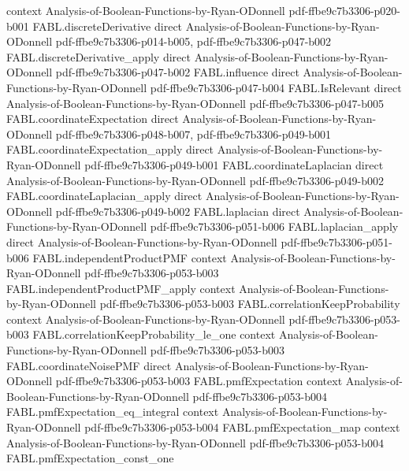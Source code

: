 \begin{theorem}
  {context}
  {Analysis-of-Boolean-Functions-by-Ryan-ODonnell}
  {pdf-ffbe9c7b3306-p020-b001}
\proofstep
  {FABL.discreteDerivative}
  {direct}
  {Analysis-of-Boolean-Functions-by-Ryan-ODonnell}
  {pdf-ffbe9c7b3306-p014-b005,
    pdf-ffbe9c7b3306-p047-b002}
\proofstep
  {FABL.discreteDerivative_apply}
  {direct}
  {Analysis-of-Boolean-Functions-by-Ryan-ODonnell}
  {pdf-ffbe9c7b3306-p047-b002}
\proofstep
  {FABL.influence}
  {direct}
  {Analysis-of-Boolean-Functions-by-Ryan-ODonnell}
  {pdf-ffbe9c7b3306-p047-b004}
\proofstep
  {FABL.IsRelevant}
  {direct}
  {Analysis-of-Boolean-Functions-by-Ryan-ODonnell}
  {pdf-ffbe9c7b3306-p047-b005}
\proofstep
  {FABL.coordinateExpectation}
  {direct}
  {Analysis-of-Boolean-Functions-by-Ryan-ODonnell}
  {pdf-ffbe9c7b3306-p048-b007,
    pdf-ffbe9c7b3306-p049-b001}
\proofstep
  {FABL.coordinateExpectation_apply}
  {direct}
  {Analysis-of-Boolean-Functions-by-Ryan-ODonnell}
  {pdf-ffbe9c7b3306-p049-b001}
\proofstep
  {FABL.coordinateLaplacian}
  {direct}
  {Analysis-of-Boolean-Functions-by-Ryan-ODonnell}
  {pdf-ffbe9c7b3306-p049-b002}
\proofstep
  {FABL.coordinateLaplacian_apply}
  {direct}
  {Analysis-of-Boolean-Functions-by-Ryan-ODonnell}
  {pdf-ffbe9c7b3306-p049-b002}
\proofstep
  {FABL.laplacian}
  {direct}
  {Analysis-of-Boolean-Functions-by-Ryan-ODonnell}
  {pdf-ffbe9c7b3306-p051-b006}
\proofstep
  {FABL.laplacian_apply}
  {direct}
  {Analysis-of-Boolean-Functions-by-Ryan-ODonnell}
  {pdf-ffbe9c7b3306-p051-b006}
\proofstep
  {FABL.independentProductPMF}
  {context}
  {Analysis-of-Boolean-Functions-by-Ryan-ODonnell}
  {pdf-ffbe9c7b3306-p053-b003}
\proofstep
  {FABL.independentProductPMF_apply}
  {context}
  {Analysis-of-Boolean-Functions-by-Ryan-ODonnell}
  {pdf-ffbe9c7b3306-p053-b003}
\proofstep
  {FABL.correlationKeepProbability}
  {context}
  {Analysis-of-Boolean-Functions-by-Ryan-ODonnell}
  {pdf-ffbe9c7b3306-p053-b003}
\proofstep
  {FABL.correlationKeepProbability_le_one}
  {context}
  {Analysis-of-Boolean-Functions-by-Ryan-ODonnell}
  {pdf-ffbe9c7b3306-p053-b003}
\proofstep
  {FABL.coordinateNoisePMF}
  {direct}
  {Analysis-of-Boolean-Functions-by-Ryan-ODonnell}
  {pdf-ffbe9c7b3306-p053-b003}
\proofstep
  {FABL.pmfExpectation}
  {context}
  {Analysis-of-Boolean-Functions-by-Ryan-ODonnell}
  {pdf-ffbe9c7b3306-p053-b004}
\proofstep
  {FABL.pmfExpectation_eq_integral}
  {context}
  {Analysis-of-Boolean-Functions-by-Ryan-ODonnell}
  {pdf-ffbe9c7b3306-p053-b004}
\proofstep
  {FABL.pmfExpectation_map}
  {context}
  {Analysis-of-Boolean-Functions-by-Ryan-ODonnell}
  {pdf-ffbe9c7b3306-p053-b004}
\proofstep
  {FABL.pmfExpectation_const_one}

\end{theorem}
